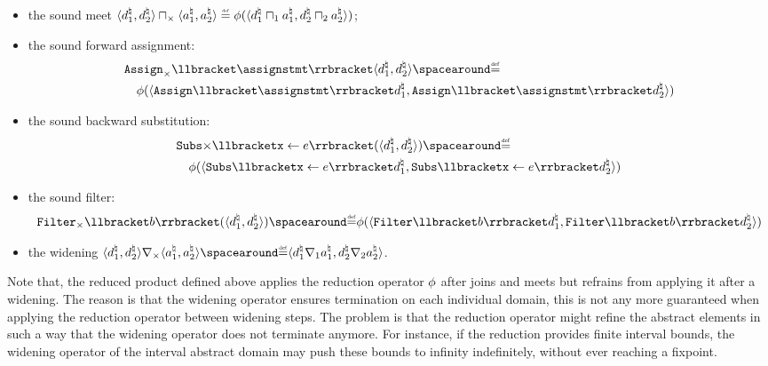 \begin{definition}
\begin{itemize}
  \item the sound meet $\tuple{\defabstractvalue_1}{\defabstractvalue_2} \productdomainmeet \tuple{\defotherabstractvalue_1}{\defotherabstractvalue_2} \defeq \productdomainreduce(\tuple{\defabstractvalue_1 \abstractdomainmeet_1 \defotherabstractvalue_1}{\defabstractvalue_2 \abstractdomainmeet_2 \defotherabstractvalue_2})$;
  \item the sound forward assignment:
  \begin{align*}
    &\productdomainassign\semanticsof{\assignstmt}\tuple{\defabstractvalue_1}{\defabstractvalue_2} \DefeQ \\
    &\quad \productdomainreduce(\tuple{\abstractdomainassign\semanticsof{\assignstmt}\defabstractvalue_1}{\abstractdomainassign\semanticsof{\assignstmt}\defabstractvalue_2})
  \end{align*}
  \item the sound backward substitution:
  \begin{align*}
    &\productdomainsubsitute\substitutionof{\defvariable}{\defaexp}(\tuple{\defabstractvalue_1}{\defabstractvalue_2}) \DefeQ \\
    &\quad\productdomainreduce(\tuple{\abstractdomainsubstitute{\defvariable}{\defaexp}\defabstractvalue_1}{\abstractdomainsubstitute{\defvariable}{\defaexp}\defabstractvalue_2})
  \end{align*}
  \item the sound filter:
  \begin{align*}
    \productdomainfilter\semanticsof{\defbexp}(\tuple{\defabstractvalue_1}{\defabstractvalue_2}) \DefeQ  \productdomainreduce(\tuple{\abstractdomainfilter\semanticsof{\defbexp}\defabstractvalue_1}{\abstractdomainfilter\semanticsof{\defbexp}\defabstractvalue_2})
  \end{align*}
  \item the widening $\tuple{\defabstractvalue_1}{\defabstractvalue_2} \productdomainwidening \tuple{\defotherabstractvalue_1}{\defotherabstractvalue_2} \DefeQ \tuple{\defabstractvalue_1 \abstractdomainwidening_1 \defotherabstractvalue_1}{\defabstractvalue_2 \abstractdomainwidening_2 \defotherabstractvalue_2}$.
\end{itemize}
\end{definition}

Note that, the reduced product defined above applies the reduction operator $\phi$ after joins and meets but refrains from applying it after a widening. The reason is that the widening operator ensures termination on each individual domain, this is not any more guaranteed when applying the reduction operator between widening steps. The problem is that the reduction operator might refine the abstract elements in such a way that the widening operator does not terminate anymore. For instance, if the reduction provides finite interval bounds, the widening operator of the interval abstract domain may push these bounds to infinity indefinitely, without ever reaching a fixpoint.

